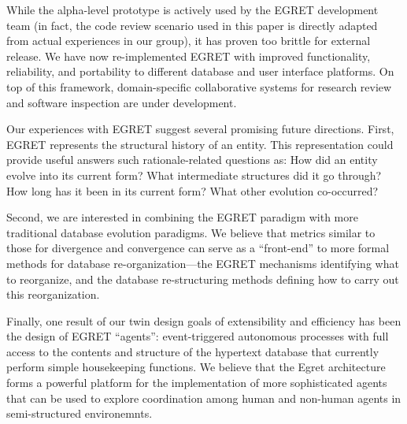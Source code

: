 While the alpha-level prototype is actively used by the EGRET development team (in fact, the code review scenario used in this paper is directly adapted from actual experiences in our group), it has proven too brittle for external release.  We have now re-implemented EGRET with improved functionality, reliability, and portability to different database and user interface platforms.  On top of this framework, domain-specific collaborative systems for research review \cite{csdl-92-03} and software inspection \cite{csdl-92-04} are under development.

Our experiences with EGRET suggest several promising future directions. First, EGRET represents the structural history of an entity. This representation could provide useful answers such rationale-related questions as: How did an entity evolve into its current form? What intermediate structures did it go through?  How long has it been in its current form? What other evolution co-occurred?

Second, we are interested in combining the EGRET paradigm with more traditional database evolution paradigms.  We believe that metrics similar to those for divergence and convergence can serve as a ``front-end'' to more formal methods for database re-organization---the EGRET mechanisms identifying what to reorganize, and the database re-structuring methods defining how to carry out this reorganization.

Finally, one result of our twin design goals of extensibility and efficiency has been the design of EGRET ``agents'': event-triggered autonomous processes with full access to the contents and structure of the hypertext database that currently perform simple housekeeping functions.   We believe that the Egret architecture forms a powerful platform for the implementation of more sophisticated agents that can be used to explore coordination among human and non-human agents in semi-structured environemnts.  


 




